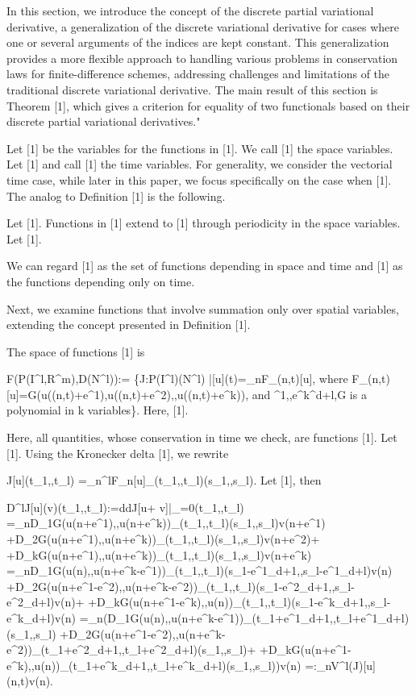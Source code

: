 \documentclass{article}
\begin{document}
{In this section, we introduce the concept of the discrete partial variational derivative, a generalization of the discrete variational derivative for cases where one or several arguments of the indices are kept constant. This generalization provides a more flexible approach to handling various problems in conservation laws for finite-difference schemes, addressing challenges and limitations of the traditional discrete variational derivative. The main result of this section is Theorem [1], which gives a criterion for equality of two functionals based on their discrete partial variational derivatives."

Let [1] be the variables for the functions in [1]. We call [1] the space variables. Let [1] and call [1] the time variables. For generality, we consider the vectorial time case, while later in this paper, we focus specifically on the case when [1].
The analog to Definition [1] is the following. 

	Let [1].
	Functions in [1] extend to [1] through  periodicity in the space variables.
	Let [1].

We can regard [1] as the set of functions depending in space and time and [1] as the functions depending only on time. 

Next, we examine functions that involve summation only over spatial variables, extending the concept presented in Definition [1].

	
	The space of functions [1] is
	
		{F}({P}({I}^l,{R}^m),{D}({N}^l)):=	
		\{{J}:{P}({I}^l)({N}^l) |[u](t)=_{n}F_{(n,t)}[u],
		{where } F_{(n,t)}[u]=G(u((n,t)+e^1),u((n,t)+e^2),,u((n,t)+e^k)),
		{and }
		^1,,e^k^{d+l},{G is a polynomial in k variables}\}.
	Here, [1].


Here, all quantities, whose conservation in time we check, are functions [1]. 
Let [1]. Using the Kronecker delta [1], we rewrite

	{J}[u](t_1,,t_{l})
	=_{{n}^l}F_{{n}}[u]_{(t_1,,t_{l})}(s_1,,s_l).
Let [1], then


	D^l{J}[u](v)(t_1,,t_{l}):={d}{d}{J}[u+ v]|_{=0}(t_1,,t_{l})
	=_{{n}}D_1G(u({n}+e^1),,u({n}+e^k))_{(t_1,,t_{l})}(s_1,,s_l)v({n}+e^1)
	+D_2G(u({n}+e^1),,u({n}+e^k))_{(t_1,,t_{l})}(s_1,,s_l)v({n}+e^2)+
	+D_kG(u({n}+e^1),,u({n}+e^k))_{(t_1,,t_{l})}(s_1,,s_l)v({n}+e^k)
	=_{{n}}D_1G(u({n}),,u({n}+e^k-e^1))_{(t_1,,t_{l})}(s_1-e^1_{d+1},,s_l-e^1_{d+l})v({n})
	+D_2G(u({n}+e^1-e^2),,u({n}+e^k-e^2))_{(t_1,,t_{l})}(s_1-e^2_{d+1},,s_l-e^2_{d+l})v({n})+
	+D_kG(u({n}+e^1-e^k),,u({n}))_{(t_1,,t_{l})}(s_1-e^k_{d+1},,s_l-e^k_{d+l})v({n})
	=_{{n}}(D_1G(u({n}),,u({n}+e^k-e^1))_{(t_1+e^1_{d+1},,t_{l}+e^1_{d+l})}(s_1,,s_l)
	+D_2G(u({n}+e^1-e^2),,u({n}+e^k-e^2))_{(t_1+e^2_{d+1},,t_{l}+e^2_{d+l})}(s_1,,s_l)+
	+D_kG(u({n}+e^1-e^k),,u({n}))_{(t_1+e^k_{d+1},,t_{l}+e^k_{d+l})}(s_1,,s_l))v({n})
	=:_{{n}}{V}^l({J})[u]({n},t)v({n}).


}
\end{document}
